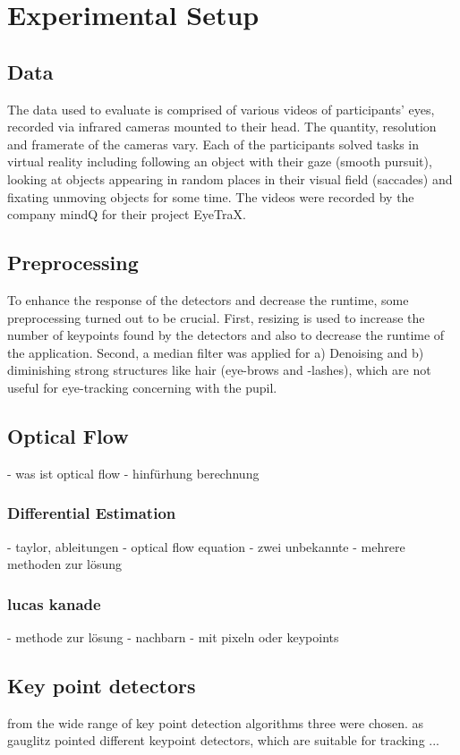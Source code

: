 \documentclass[Bachelorarbeit.tex]{subfiles}
\begin{document}
\newpage
\section{Experimental Setup}
\label{Experimental Setup}


\subsection{Data}
The data used to evaluate is comprised of various videos of participants' eyes, recorded via infrared cameras mounted to their head. The quantity, resolution and framerate of the cameras vary. Each of the participants solved tasks in virtual reality including following an object with their gaze (smooth pursuit), looking at objects appearing in random places in their visual field (saccades) and fixating unmoving objects for some time. The videos were recorded by the company mindQ for their project EyeTraX. 

\subsection{Preprocessing}
To enhance the response of the detectors and decrease the runtime, some preprocessing turned out to be crucial. First, resizing is used to increase the number of keypoints found by the detectors and also to decrease the runtime of the application.
Second, a median filter was applied for a) Denoising and b) diminishing strong structures like hair (eye-brows and -lashes), which are not useful for eye-tracking concerning with the pupil. 

\subsection{Optical Flow}
- was ist optical flow
- hinfürhung berechnung 
\subsubsection{Differential Estimation}
- taylor, ableitungen
- optical flow equation
- zwei unbekannte
- mehrere methoden zur lösung

\subsubsection{lucas kanade}
- methode zur lösung
- nachbarn
- mit pixeln oder keypoints
\subsection{Key point detectors}
from the wide range of key point detection algorithms three were chosen. as gauglitz pointed different keypoint detectors, which are suitable for tracking
...
\end{document}
